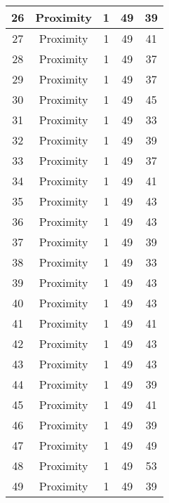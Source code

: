 \documentclass[results.tex]{subfiles}
\begin{document}
\begin{center}
\begin{tabular}{| c || c | c | c | c |}
    \hline
    26 & Proximity & 1 & 49 & 39 \\ 
    \hline
    27 & Proximity & 1 & 49 & 41 \\ 
    \hline
    28 & Proximity & 1 & 49 & 37 \\ 
    \hline
    29 & Proximity & 1 & 49 & 37 \\ 
    \hline
    30 & Proximity & 1 & 49 & 45 \\ 
    \hline
    31 & Proximity & 1 & 49 & 33 \\ 
    \hline
    32 & Proximity & 1 & 49 & 39 \\ 
    \hline
    33 & Proximity & 1 & 49 & 37 \\ 
    \hline
    34 & Proximity & 1 & 49 & 41 \\ 
    \hline
    35 & Proximity & 1 & 49 & 43 \\ 
    \hline
    36 & Proximity & 1 & 49 & 43 \\ 
    \hline
    37 & Proximity & 1 & 49 & 39 \\ 
    \hline
    38 & Proximity & 1 & 49 & 33 \\ 
    \hline
    39 & Proximity & 1 & 49 & 43 \\ 
    \hline
    40 & Proximity & 1 & 49 & 43 \\ 
    \hline
    41 & Proximity & 1 & 49 & 41 \\ 
    \hline
    42 & Proximity & 1 & 49 & 43 \\ 
    \hline
    43 & Proximity & 1 & 49 & 43 \\ 
    \hline
    44 & Proximity & 1 & 49 & 39 \\ 
    \hline
    45 & Proximity & 1 & 49 & 41 \\ 
    \hline
    46 & Proximity & 1 & 49 & 39 \\ 
    \hline
    47 & Proximity & 1 & 49 & 49 \\ 
    \hline
    48 & Proximity & 1 & 49 & 53 \\ 
    \hline
    49 & Proximity & 1 & 49 & 39 \\ 
    \hline   \end{tabular}
\end{center}
\end{document}
